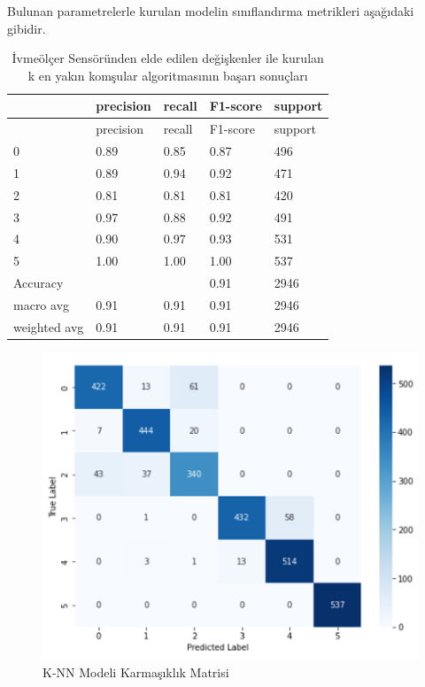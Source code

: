 \documentclass[12pt,twoside]{deuthesis}
\begin{document}
Bulunan parametrelerle kurulan modelin sınıflandırma metrikleri aşağıdaki gibidir.
\begin{longtable}[]{@{}lllll@{}}
\caption{\label{tab:iknn} İvmeölçer Sensöründen elde edilen değişkenler ile kurulan k en yakın komşular algoritmasının başarı sonuçları}\tabularnewline
\toprule()
& precision & recall & F1-score & support \\
\midrule()
\endfirsthead
\toprule()
& precision & recall & F1-score & support \\
\midrule()
\endhead
0 & 0.89 & 0.85 & 0.87 & 496 \\
1 & 0.89 & 0.94 & 0.92 & 471 \\
2 & 0.81 & 0.81 & 0.81 & 420 \\
3 & 0.97 & 0.88 & 0.92 & 491 \\
4 & 0.90 & 0.97 & 0.93 & 531 \\
5 & 1.00 & 1.00 & 1.00 & 537 \\
Accuracy & & & 0.91 & 2946 \\
macro avg & 0.91 & 0.91 & 0.91 & 2946 \\
weighted avg & 0.91 & 0.91 & 0.91 & 2946 \\
\bottomrule()
\end{longtable}
\begin{figure}

{\centering \includegraphics[width=0.9\linewidth,height=0.35\textheight]{figure/iknn_confmat} 

}

\caption{K-NN Modeli Karmaşıklık Matrisi}\label{fig:iknnconfmat}
\end{figure}
\end{document}
